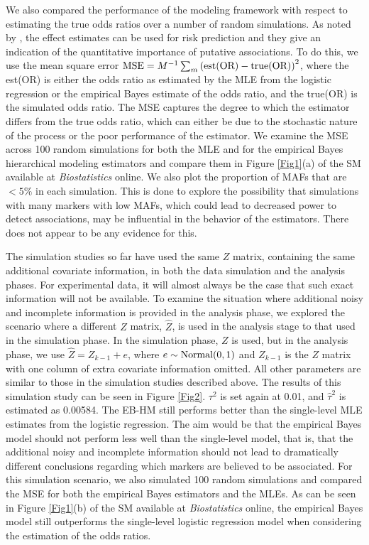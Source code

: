 \documentclass[oupdraft]{bio}
\begin{document}
We also compared the performance of the modeling framework
with respect to estimating the true odds ratios over a number
of random simulations. As noted by
\citet{Wahba:1990},
the effect estimates can be used for risk prediction and they
give an indication of the quantitative importance of putative
associations. To do this, we use the mean square error
$\hbox{MSE} = M^{-1}
\sum_m \left( \hbox{est(OR)} - \hbox{true(OR)}\right)^2$,
where the est(OR) is either the odds ratio as estimated by
the MLE from the logistic regression or the empirical Bayes
estimate of the odds ratio, and the true(OR) is the
simulated odds ratio. The MSE captures the degree to which the
estimator differs from the true odds ratio, which can either be
due to the stochastic nature of the process or the poor
performance of the estimator. We examine the MSE across 100 random
simulations for both the MLE and for the empirical Bayes
hierarchical modeling estimators and compare them in
Figure \ref{Fig1}(a) of the SM available at \textit{Biostatistics}
online. We also plot the proportion of MAFs that are $< 5\%$
in each simulation. This is done to explore the possibility
that simulations with many markers with low MAFs, which could
lead to decreased power to detect associations, may be
influential in the behavior of the estimators. There does
not appear to be any evidence for this.

The simulation studies so far have used the same $Z$ matrix,
containing the same additional covariate information, in
both the data simulation and the analysis phases. For
experimental data, it will almost always be the case that
such exact information will not be available. To examine
the situation where additional noisy and incomplete
information is provided in the analysis phase, we explored
the scenario where a different $Z$ matrix, $\hat{Z}$,
is used in the analysis stage to that used in the simulation
phase. In the simulation phase, $Z$ is used, but in the
analysis phase, we use $\hat{Z} = Z_{k - 1} + e$, where
$e \sim \hbox{Normal} (0, 1)$ and $Z_{k - 1}$ is the $Z$
matrix with one column of extra covariate information
omitted. All other parameters are similar to those in the
simulation studies described above. The results of this
simulation study can be seen in Figure \ref{Fig2}.
$\tau^2$ is set again at 0.01, and $\hat{\tau}^2$ is
estimated as 0.00584. The EB-HM still performs better
than the single-level MLE estimates from the logistic
regression. The aim would be that the empirical Bayes
model should not perform less well than the single-level
model, that is, that the additional noisy and incomplete
information should not lead to dramatically different
conclusions regarding which markers are believed to be
associated. For this simulation scenario, we also
simulated 100 random simulations and compared the
MSE for both the empirical Bayes estimators and the
MLEs. As can be seen in Figure \ref{Fig1}(b) of the
SM available at \textit{Biostatistics} online, the
empirical Bayes model still outperforms the single-level
logistic regression model when considering the estimation
of the odds ratios.
\end{document}
